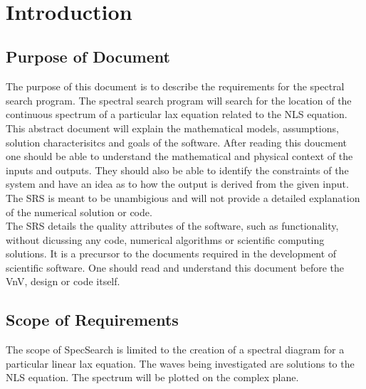 \documentclass[12pt]{article}
\begin{document}

\newpage

\tableofcontents

~\newpage


\section{Introduction}

\subsection{Purpose of Document}
The purpose of this document is to describe the requirements for the spectral 
search program. The spectral search program will search for the location of the 
continuous spectrum of a particular lax equation related to the NLS equation. 
This abstract document will explain the mathematical models, assumptions, 
solution characterisitcs and goals of the software. After reading this doucment 
one should be able to understand the mathematical and physical context of the 
inputs and outputs. They should also be able to identify the constraints of the 
system and have an idea as to how the output is derived from the given input.  
The SRS is meant to be unambigious and will not provide a detailed explanation 
of the numerical solution or code. \\
The SRS details the quality attributes of the software, such as functionality, 
without dicussing any code, numerical algorithms or scientific computing 
solutions. It is a precursor to the documents required in the development of 
scientific software. One should read and understand this document before the 
VnV, design or code itself. \\


\subsection{Scope of Requirements} 

The scope of SpecSearch is limited to the creation of a spectral diagram for a 
particular linear lax equation. The waves being investigated are solutions to 
the NLS equation. The spectrum will be plotted on the complex plane. 
\end{document}

